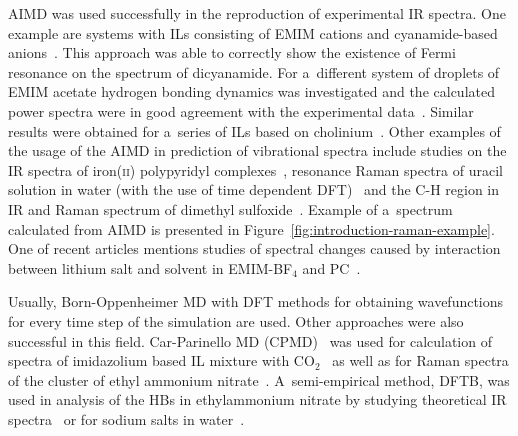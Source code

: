 AIMD was used successfully in the reproduction of experimental IR spectra. One example are systems with ILs consisting of EMIM cations and cyanamide-based anions~\cite{aimd-spectrum-1}. This approach was able to correctly show the existence of Fermi resonance on the spectrum of dicyanamide. For a~different system of droplets of EMIM acetate hydrogen bonding dynamics was investigated and the calculated power spectra were in good agreement with the experimental data~\cite{aimd-spectrum-2}.  Similar results were obtained for a~series of ILs based on cholinium~\cite{aimd-spectrum-3}. Other examples of the usage of the AIMD in prediction of vibrational spectra include studies on the IR spectra of iron(\textsc{ii}) polypyridyl complexes~\cite{aimd-spectrum-4}, resonance Raman spectra of uracil solution in water (with the use of time dependent DFT)~\cite{aimd-spectrum-5} and the C-H region in IR and Raman spectrum of dimethyl sulfoxide~\cite{aimd-spectrum-6}. Example of a~spectrum calculated from AIMD is presented in Figure~\ref{fig:introduction-raman-example}. One of recent articles mentions studies of spectral changes caused by interaction between lithium salt and solvent in EMIM-BF$_4$ and PC~\cite{aimd-spectrum-7}.

Usually, Born-Oppenheimer MD with DFT methods for obtaining wavefunctions for every time step of the simulation are used. Other approaches were also successful in this field. Car-Parinello MD (CPMD)~\cite{cpmd} was used for calculation of spectra of imidazolium based IL mixture with CO$_2$~\cite{cpmd-spectrum-1} as well as for Raman spectra of the cluster of ethyl ammonium nitrate~\cite{il-md-4}. A~semi-empirical method, DFTB, was used in analysis of the HBs in ethylammonium nitrate by studying theoretical IR spectra~\cite{dftb-spectrum-1} or for sodium salts in water~\cite{dftb-spectrum-2}.